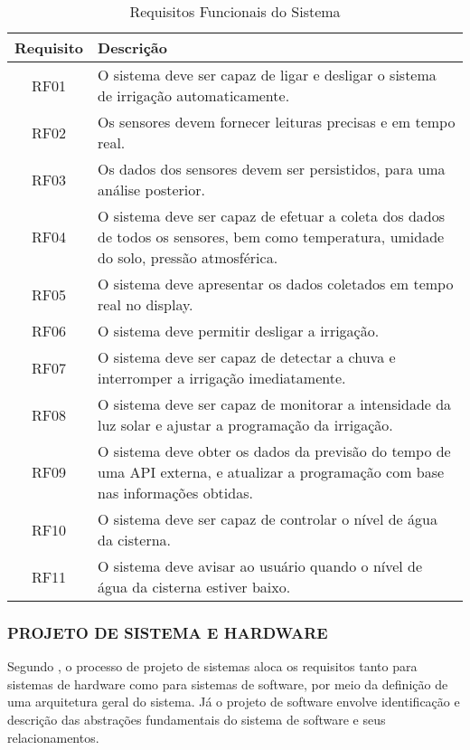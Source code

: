 \documentclass[%
  article,%
  a4paper,%
  12pt,%
  fleqn,%
  oneside,%
  chapter = TITLE,%
  section = TITLE,%
]{abntex2}
\begin{document}
\begin{table}[!htb]
\renewcommand{\tablename}{Quadro}
\captionsetup{justification=raggedright,singlelinecheck=false}
    \caption{Requisitos Funcionais do Sistema}%
    \centering%
    \label{table:result}
    \begin{tabular*}{\textwidth}{@{\extracolsep{\fill}} c >{\raggedright\arraybackslash}p{}}
        \toprule
        \textbf{Requisito} & \textbf{Descrição} \\
        \midrule
        RF01 & O sistema deve ser capaz de ligar e desligar o sistema de irrigação automaticamente. \\
        RF02 & Os sensores devem fornecer leituras precisas e em tempo real. \\
        RF03 & Os dados dos sensores devem ser persistidos, para uma análise posterior. \\
        RF04 & O sistema deve ser capaz de efetuar a coleta dos dados de todos os sensores, bem como temperatura, umidade do solo, pressão atmosférica.\\
        RF05 & O sistema deve apresentar os dados coletados em tempo real no display.\\
        RF06 & O sistema deve permitir desligar a irrigação. \\
        RF07 & O sistema deve ser capaz de detectar a chuva e interromper a irrigação imediatamente. \\
        RF08 & O sistema deve ser capaz de monitorar a intensidade da luz solar e ajustar a programação da irrigação. \\
        RF09 & O sistema deve obter os dados da previsão do tempo de uma API externa, e atualizar a programação com base nas informações obtidas. \\
        RF10 & O sistema deve ser capaz de controlar o nível de água da cisterna. \\
        RF11 & O sistema deve avisar ao usuário quando o nível de água da cisterna estiver baixo. \\
        \bottomrule
    \end{tabular*}
\end{table}

\newpage

\subsubsection{PROJETO DE SISTEMA E HARDWARE}
Segundo \citet{Sommerville2011}, o processo de projeto de sistemas aloca os requisitos tanto para sistemas de hardware como para sistemas de software, por meio da definição de uma arquitetura geral do sistema. Já o projeto de software envolve identificação e descrição das abstrações fundamentais do sistema de software e seus relacionamentos.
\end{document}
